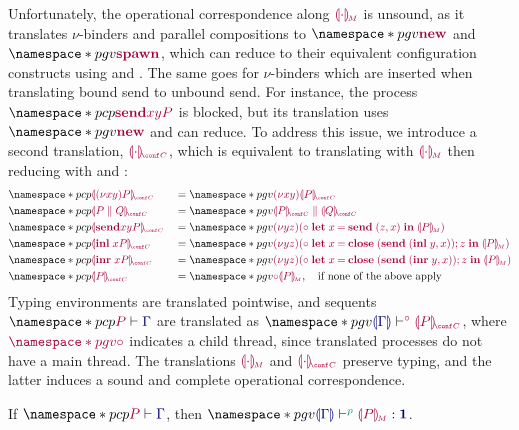 Unfortunately, the operational correspondence along $\tm{\cpgvM{\cdot}}$ is unsound, as it translates $\nu$-binders and parallel compositions to $\pgv{\tm{\new}}$ and $\pgv{\tm{\spawn}}$, which can reduce to their equivalent configuration constructs using  and . The same goes for $\nu$-binders which are inserted when translating bound send to unbound send. For instance, the process $\pcp{\tm{\send{x}{y}{P}}}$ is blocked, but its translation uses $\pgv{\tm{\new}}$ and can reduce.
To address this issue, we introduce a second translation, $\tm{\cpgvC{\cdot}}$, which is equivalent to translating with $\tm{\cpgvM{\cdot}}$ then reducing with  and :
\begin{align*}
  &\pcp{\tm{\cpgvC{\res{x}{y}{P}}}}
  &&= \pgv{\tm{\res{x}{y}{\cpgvC{P}}}}
  \\
  &\pcp{\tm{\cpgvC{\ppar{P}{Q}}}}
  &&= \pgv{\tm{\ppar{\cpgvC{P}}{\cpgvC{Q}}}}
  \\
  &\pcp{\tm{\cpgvC{\send{x}{y}{P}}}}
  &&= \pgv{\tm{\res{y}{z}{(\child\;\letbind{x}{\send\;\pair{z}{x}}{\cpgvM{P}})}}}
  \\
  &\pcp{\tm{\cpgvC{\inl{x}{P}}}}
  &&= \pgv{\tm{\res{y}{z}{(\child\;\letbind{x}{\andthen{\close\;(\send\;\pair{\inl{y}}{x})}{z}}{\cpgvM{P}})}}}
  \\
  &\pcp{\tm{\cpgvC{\inr{x}{P}}}}
  &&= \pgv{\tm{\res{y}{z}{(\child\;\letbind{x}{\andthen{\close\;(\send\;\pair{\inr{y}}{x})}{z}}{\cpgvM{P}})}}}
  \\
  &\pcp{\tm{\cpgvC{P}}}
  &&= \pgv{\tm{\child{\cpgvM{P}}}},\quad\text{if none of the above apply}
\end{align*}
Typing environments are translated pointwise, and sequents $\pcp{\seq{P}{\ty{\Gamma}}}$ are translated as $\pgv{\cseq[\child]{\ty{\cpgvT{\ty{\Gamma}}}}{\cpgvC{P}}}$, where $\tm{\pgv{\child}}$ indicates a child thread, since translated processes do not have a main thread.
The translations $\tm{\cpgvM{\cdot}}$ and $\tm{\cpgvC{\cdot}}$ preserve typing, and the latter induces a sound and complete operational correspondence.

\begin{lemma}%
  \label{lem:pcp-to-pgv-terms-preservation}
  If $\pcp{\seq{P}{\ty{\Gamma}}}$, then $\pgv{\tseq[\cs{p}]{\ty{\cpgvT{\Gamma}}}{\cpgvM{P}}{\tyunit}}$.
\end{lemma}



